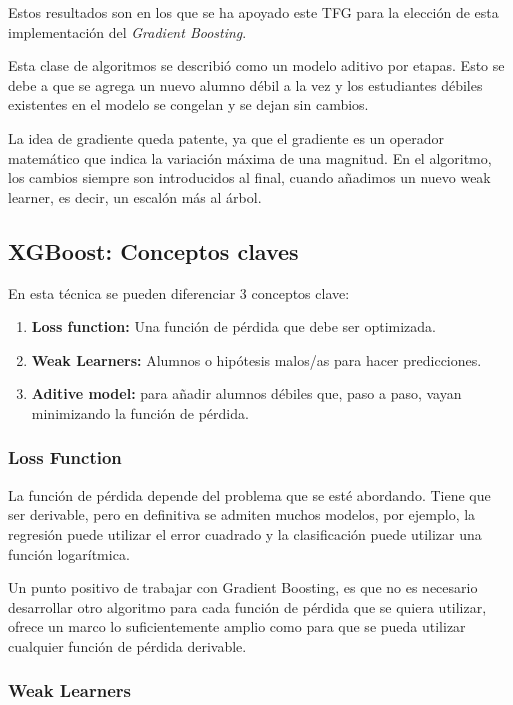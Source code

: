 Estos resultados son en los que se ha apoyado este TFG para la elección de esta implementación del \textit{Gradient Boosting}.\par 

Esta clase de algoritmos se describió como un modelo aditivo por etapas. Esto se debe a que se agrega un nuevo alumno débil a la vez y los estudiantes débiles existentes en el modelo se congelan y se dejan sin cambios.\par 
 
La idea de gradiente queda patente, ya que el gradiente es un operador matemático que indica la variación máxima de una magnitud. En el algoritmo, los cambios siempre son introducidos al final, cuando añadimos un nuevo weak learner, es decir, un escalón más al árbol.

\subsection{XGBoost: Conceptos claves}
En esta técnica se pueden diferenciar 3 conceptos clave:\cite{XGBoost}
\begin{enumerate}
\item \textbf{Loss function:} Una función de pérdida que debe ser optimizada.
\item \textbf{Weak Learners:} Alumnos o hipótesis malos/as para hacer predicciones.
\item \textbf{Aditive model:} para añadir alumnos débiles que, paso a paso, vayan minimizando la función de pérdida.
\end{enumerate}

\subsubsection{Loss Function}

La función de pérdida depende del problema que se esté abordando. Tiene que ser derivable, pero en definitiva se admiten muchos modelos, por ejemplo, la regresión puede utilizar el error cuadrado y la clasificación puede utilizar una función logarítmica.\par 
Un punto positivo de trabajar con Gradient Boosting, es que no es necesario desarrollar otro algoritmo para cada función de pérdida que se quiera utilizar, ofrece un marco lo suficientemente amplio como para que se pueda utilizar cualquier función de pérdida derivable.

\subsubsection{Weak Learners}	

